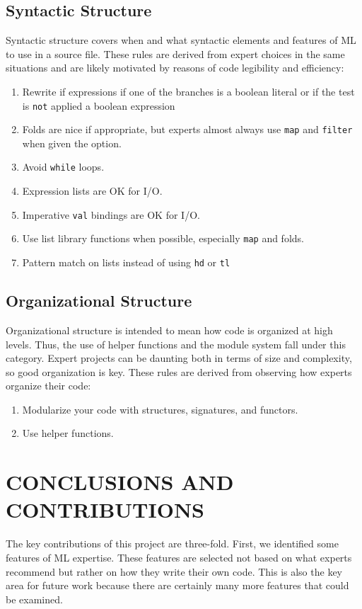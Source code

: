 \documentclass[12pt,abstracton]{scrartcl}
\begin{document}
\subsection{Syntactic Structure}
Syntactic structure covers when and what syntactic elements and features of ML to use
in a source file. These rules are derived from expert choices in the same
situations and are likely motivated by reasons of code legibility and efficiency:
\begin{enumerate}
\item Rewrite if expressions if one of the branches is a boolean literal or if the test is \texttt{not} applied a boolean expression
\item Folds are nice if appropriate, but experts almost always use \texttt{map} and \texttt{filter} when given the option.
\item Avoid \texttt{while} loops.
\item Expression lists are OK for I/O.
\item Imperative \texttt{val} bindings are OK for I/O.
\item Use list library functions when possible, especially \texttt{map} and folds.
\item Pattern match on lists instead of using \texttt{hd} or \texttt{tl}
\end{enumerate}
\subsection{Organizational Structure}
Organizational structure is intended to mean how code is organized at high levels.
Thus, the use of helper functions and the module system fall under this category.
Expert projects can be daunting both in terms of size and complexity, so good
organization is key. These rules are derived from observing how experts organize their code:
\begin{enumerate}
\item Modularize your code with structures, signatures, and functors.
\item Use helper functions.
\end{enumerate}
\section{CONCLUSIONS AND CONTRIBUTIONS}\label{sec:future}
The key contributions of this project are three-fold. First, we
identified some features of ML expertise. These features are
selected not based on what experts recommend but rather on how they
write their own code. This is also the key area for future work
because there are certainly many more features that could be examined.
\end{document}
